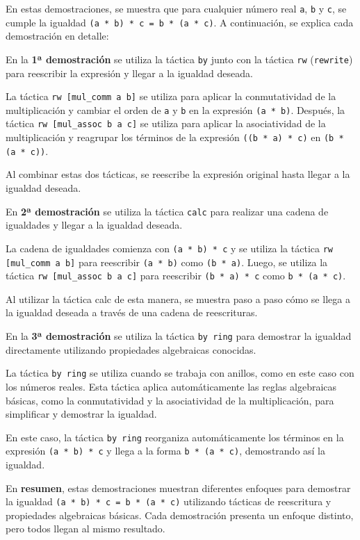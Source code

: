 En estas demostraciones, se muestra que para cualquier número real \texttt{a}, \texttt{b}
y \texttt{c}, se cumple la igualdad \texttt{(a * b) * c = b * (a * c)}. A continuación, se
explica cada demostración en detalle:

En la \textbf{1ª demostración} se utiliza la táctica \texttt{by} junto con la táctica \texttt{rw}
(\texttt{rewrite}) para reescribir la expresión y llegar a la igualdad deseada.

La táctica \texttt{rw [mul\_comm a b]} se utiliza para aplicar la conmutatividad
de la multiplicación y cambiar el orden de \texttt{a} y \texttt{b} en la expresión
\texttt{(a * b)}. Después, la táctica \texttt{rw [mul\_assoc b a c]} se utiliza para aplicar la
asociatividad de la multiplicación y reagrupar los términos de la
expresión \texttt{((b * a) * c)} en \texttt{(b * (a * c))}.

Al combinar estas dos tácticas, se reescribe la expresión original hasta
llegar a la igualdad deseada.

En \textbf{2ª demostración} se utiliza la táctica \texttt{calc} para realizar una
cadena de igualdades y llegar a la igualdad deseada.

La cadena de igualdades comienza con \texttt{(a * b) * c} y se utiliza la táctica
\texttt{rw [mul\_comm a b]} para reescribir \texttt{(a * b)} como \texttt{(b * a)}. Luego, se
utiliza la táctica \texttt{rw [mul\_assoc b a c]} para reescribir \texttt{(b * a) * c} como
\texttt{b * (a * c)}.

Al utilizar la táctica calc de esta manera, se muestra paso a paso cómo
se llega a la igualdad deseada a través de una cadena de reescrituras.

En la \textbf{3ª demostración} se utiliza la táctica \texttt{by ring} para demostrar
la igualdad directamente utilizando propiedades algebraicas conocidas.

La táctica \texttt{by ring} se utiliza cuando se trabaja con anillos, como en
este caso con los números reales. Esta táctica aplica automáticamente
las reglas algebraicas básicas, como la conmutatividad y la
asociatividad de la multiplicación, para simplificar y demostrar la
igualdad.

En este caso, la táctica \texttt{by ring} reorganiza automáticamente los términos
en la expresión \texttt{(a * b) * c} y llega a la forma \texttt{b * (a * c)}, demostrando
así la igualdad.

En \textbf{resumen}, estas demostraciones muestran diferentes enfoques para
demostrar la igualdad \texttt{(a * b) * c = b * (a * c)} utilizando tácticas de
reescritura y propiedades algebraicas básicas. Cada demostración
presenta un enfoque distinto, pero todos llegan al mismo resultado.

